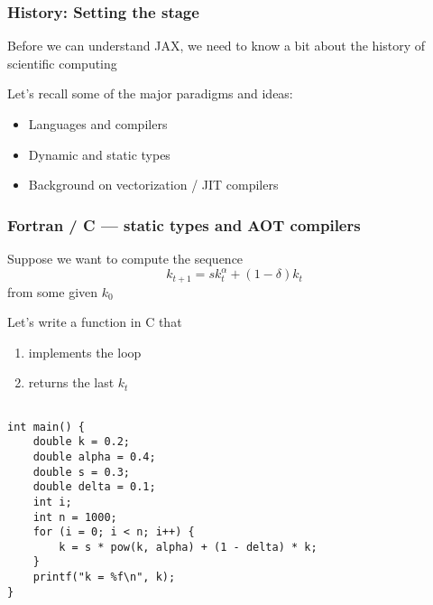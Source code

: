 \begin{frame}
    \frametitle{History: Setting the stage}

    Before we can understand JAX, we need to know a bit about the history of scientific
    computing

    \vspace{0.5em}
    Let's recall some of the major paradigms and ideas:

    \vspace{0.5em}
    \begin{itemize}
        \item Languages and compilers
    \vspace{0.5em}
        \item Dynamic and static types
    \vspace{0.5em}
        \item Background on vectorization / JIT compilers
    \end{itemize}

\end{frame}
    


\begin{frame}
    \frametitle{Fortran / C  --- static types and AOT compilers}


    \Eg Suppose we want to compute the sequence
    \begin{equation*}
        k_{t+1} = s k_t^\alpha + (1 - \delta) k_t
    \end{equation*}
    from some given $k_0$ 

        \vspace{0.5em}
        \vspace{0.5em}
        \vspace{0.5em}

    Let's write a function in C that 
    \begin{enumerate}
        \item implements the loop 
        \vspace{0.5em}
        \item returns the last $k_t$
    \end{enumerate}


\end{frame}


\begin{frame}[fragile]
    
    \begin{verbatim}

int main() {
    double k = 0.2;
    double alpha = 0.4;
    double s = 0.3;
    double delta = 0.1;
    int i;
    int n = 1000;
    for (i = 0; i < n; i++) {
        k = s * pow(k, alpha) + (1 - delta) * k;
    }
    printf("k = %f\n", k);
}
    \end{verbatim}

\end{frame}




